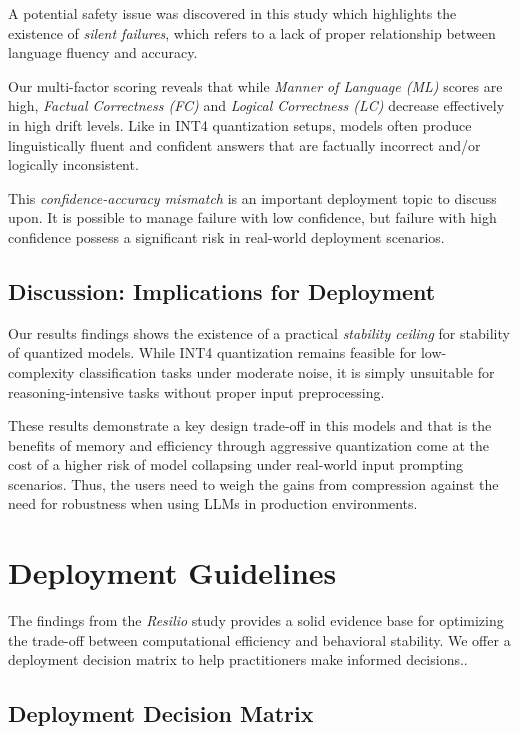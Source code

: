\documentclass[conference]{IEEEtran}
\begin{document}
A potential safety issue was discovered in this study which highlights the existence of \textit{silent failures}, which refers to a lack of proper relationship between language fluency and accuracy.

Our multi-factor scoring reveals that while \textit{Manner of Language (ML)} scores are high, \textit{Factual Correctness (FC)} and \textit{Logical Correctness (LC)} decrease effectively in high drift levels. Like in INT4 quantization setups, models often produce linguistically fluent and confident answers that are factually incorrect and/or logically inconsistent.

This \textit{confidence-accuracy mismatch} is an important deployment topic to discuss upon. It is possible to manage failure with low confidence, but failure with high confidence possess a significant risk in real-world deployment scenarios.

\subsection{Discussion: Implications for Deployment}

Our results findings shows the existence of a practical \textit{stability ceiling} for stability of quantized models. While INT4 quantization remains feasible for low-complexity classification tasks under moderate noise, it is simply unsuitable for reasoning-intensive tasks without proper input preprocessing.

These results demonstrate a key design trade-off in this models and that is the benefits of memory and efficiency through aggressive quantization come at the cost of a higher risk of model collapsing under real-world input prompting scenarios. Thus, the users need to weigh the gains from compression against the need for robustness when using LLMs in production environments.





\section{Deployment Guidelines}

The findings from the \textit{Resilio} study provides a solid evidence base for optimizing the trade-off between computational efficiency and behavioral stability. We offer a deployment decision matrix to help practitioners make informed decisions..

\subsection{Deployment Decision Matrix}
\end{document}
